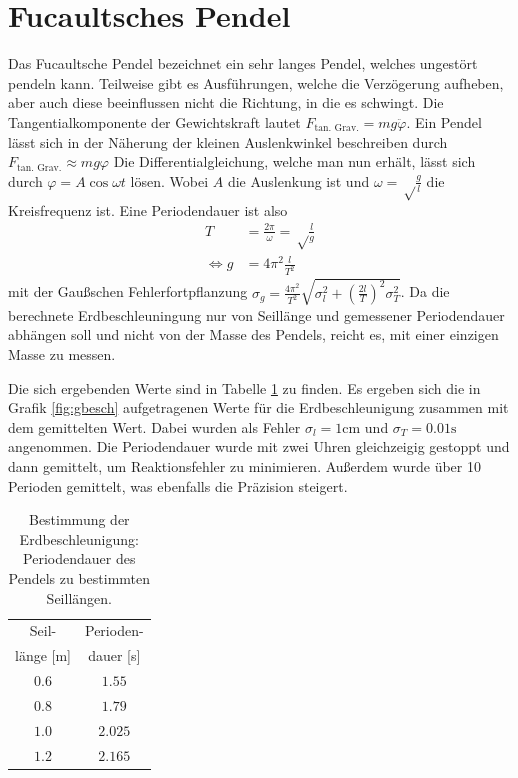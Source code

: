 \documentclass[12pt,a4paper,titlepage,headinclude,bibtotoc]{scrartcl}
\begin{document}
\section{Fucaultsches Pendel}

Das Fucaultsche Pendel bezeichnet ein sehr langes Pendel, welches ungestört pendeln kann.
Teilweise gibt es Ausführungen, welche die Verzögerung aufheben, aber auch diese beeinflussen nicht die Richtung, in die es schwingt.
Die Tangentialkomponente der Gewichtskraft lautet $F_\text{tan. Grav.}=mg\ddot\varphi$.
Ein Pendel lässt sich in der Näherung der kleinen Auslenkwinkel beschreiben durch $F_\text{tan. Grav.}\approx mg\varphi$
Die Differentialgleichung, welche man nun erhält, lässt sich durch $\varphi=A\cos\omega t$ lösen.
Wobei $A$ die Auslenkung ist und $\omega=\sqrt\frac{g}{l}$ die Kreisfrequenz ist.
Eine Periodendauer ist also
\begin{align}
	T&=\frac{2\pi}{\omega}=\sqrt\frac{l}{g}\label{eq:pendelPeriode}\\
	\Leftrightarrow g&=4\pi^2\frac{l}{T^2}
\end{align}
mit der Gaußschen Fehlerfortpflanzung $\sigma_g=\frac{4\pi^2}{T^2}\sqrt{\sigma_l^2+\left(\frac{2l}{T} \right)^2\sigma_T^2}$.
Da die berechnete Erdbeschleuningung nur von Seillänge und gemessener Periodendauer abhängen soll und nicht von der Masse des Pendels, reicht es, mit einer einzigen Masse zu messen.

Die sich ergebenden Werte sind in Tabelle \ref{tab:gbesch} zu finden.
Es ergeben sich die in Grafik \ref{fig:gbesch} aufgetragenen Werte für die Erdbeschleunigung zusammen mit dem gemittelten Wert.
Dabei wurden als Fehler $\sigma_l=1\si{\centi\meter}$ und $\sigma_T=0.01\si\second$ angenommen.
Die Periodendauer wurde mit zwei Uhren gleichzeigig gestoppt und dann gemittelt, um Reaktionsfehler zu minimieren.
Außerdem wurde über 10 Perioden gemittelt, was ebenfalls die Präzision steigert.



\begin{table}[!htb]
	\centering
	\begin{tabular}{|c|c|}
		\hline
		Seil- & Perioden- \\
		länge [m] & dauer [s] \\
		\hline
		$0.6$ & $1.55$\\
		$0.8$ & $1.79$\\
		$1.0$ & $2.025$\\
		$1.2$ & $2.165$\\
		\hline
	\end{tabular}
	\caption{Bestimmung der Erdbeschleunigung: Periodendauer des Pendels zu bestimmten Seillängen.}
	\label{tab:gbesch}
\end{table}
\end{document}

